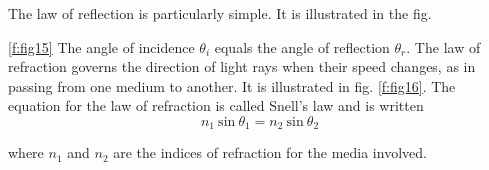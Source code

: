 The law of reflection is particularly simple.  It is illustrated in the fig. {\ref{f:fig15}  The angle of incidence $\theta_i$ equals the angle of reflection $\theta_r$.  The law of refraction governs the direction of light rays when their speed changes, as in passing from one medium to another.  It is illustrated in fig. \ref{f:fig16}.  The equation for the law of refraction is called Snell's law and is written
\begin {equation} \label{e:snell}
n_1 \ \text{sin} \ \theta_1 = n_2 \ \text{sin} \ \theta_2
\end {equation}

where $n_1$ and $n_2$ are the indices of refraction for the media involved.  



}
